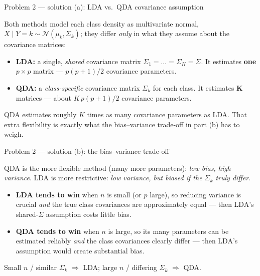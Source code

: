\documentclass[aspectratio=169,11pt]{beamer}
\begin{document}
\begin{frame}{Problem 2 --- solution (a): LDA vs.\ QDA covariance assumption}
  \begin{solutionbox}
    Both methods model each class density as multivariate normal,
    $X\mid Y=k\sim\mathcal{N}(\mu_k,\Sigma_k)$; they differ \emph{only} in what they assume
    about the covariance matrices:
    \begin{itemize}
      \item \textbf{LDA:} a single, \emph{shared} covariance matrix
        $\Sigma_1=\dots=\Sigma_K=\Sigma$. It estimates \textbf{one} $p\times p$ matrix
        --- $p(p+1)/2$ covariance parameters.
      \item \textbf{QDA:} a \emph{class-specific} covariance matrix $\Sigma_k$ for each
        class. It estimates $\mathbf{K}$ matrices --- about $K\,p(p+1)/2$ covariance
        parameters.
    \end{itemize}
  \end{solutionbox}
  \begin{takeaway}
    QDA estimates roughly $K$ times as many covariance parameters as LDA. That extra
    flexibility is exactly what the bias--variance trade-off in part (b) has to weigh.
  \end{takeaway}
\end{frame}

\begin{frame}{Problem 2 --- solution (b): the bias--variance trade-off}
  \begin{solutionbox}
    QDA is the more flexible method (many more parameters): \emph{low bias, high variance}.
    LDA is more restrictive: \emph{low variance, but biased if the $\Sigma_k$ truly differ}.
    \begin{itemize}
      \item \textbf{LDA tends to win} when $n$ is small (or $p$ large), so reducing variance
        is crucial \emph{and} the true class covariances are approximately equal --- then
        LDA's shared-$\Sigma$ assumption costs little bias.
      \item \textbf{QDA tends to win} when $n$ is large, so its many parameters can be
        estimated reliably \emph{and} the class covariances clearly differ --- then LDA's
        assumption would create substantial bias.
    \end{itemize}
  \end{solutionbox}
  \begin{takeaway}
    Small $n$ / similar $\Sigma_k$ $\Rightarrow$ LDA; large $n$ / differing $\Sigma_k$
    $\Rightarrow$ QDA.
  \end{takeaway}
\end{frame}
\end{document}
